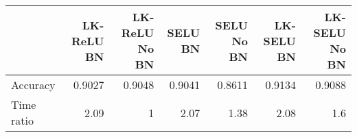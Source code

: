 \begin{tabular}{lrrrrrr}
\toprule
{} &  LK-ReLU BN &  LK-ReLU No BN &   SELU BN &  SELU No BN &  LK-SELU BN &  LK-SELU No BN \\
\midrule
Accuracy & 0.9027 &0.9048 &0.9041 &0.8611 & 0.9134 &0.9088 \\
Time ratio &    2.09 &         1 &  2.07 &    1.38 &    2.08 &       1.6 \\
\bottomrule
\end{tabular}
